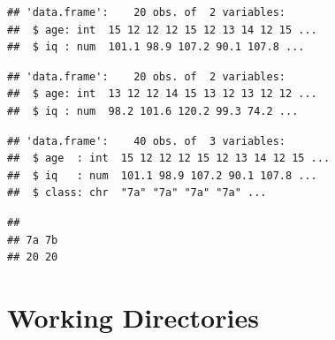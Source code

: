 \documentclass[
]{book}
\newenvironment{Shaded}{\begin{snugshade}}{\end{snugshade}}
\newcommand{\CommentTok}[1]{\textcolor[rgb]{0.56,0.35,0.01}{\textit{#1}}}
\newcommand{\FunctionTok}[1]{\textcolor[rgb]{0.13,0.29,0.53}{\textbf{#1}}}
\newcommand{\NormalTok}[1]{#1}
\newcommand{\OtherTok}[1]{\textcolor[rgb]{0.56,0.35,0.01}{#1}}
\newcommand{\SpecialCharTok}[1]{\textcolor[rgb]{0.81,0.36,0.00}{\textbf{#1}}}
\newcommand{\StringTok}[1]{\textcolor[rgb]{0.31,0.60,0.02}{#1}}
\begin{document}
\begin{verbatim}
## 'data.frame':    20 obs. of  2 variables:
##  $ age: int  15 12 12 12 15 12 13 14 12 15 ...
##  $ iq : num  101.1 98.9 107.2 90.1 107.8 ...
\end{verbatim}

\begin{verbatim}
## 'data.frame':    20 obs. of  2 variables:
##  $ age: int  13 12 12 14 15 13 12 13 12 12 ...
##  $ iq : num  98.2 101.6 120.2 99.3 74.2 ...
\end{verbatim}

\begin{Shaded}
\end{Shaded}

\begin{verbatim}
## 'data.frame':    40 obs. of  3 variables:
##  $ age  : int  15 12 12 12 15 12 13 14 12 15 ...
##  $ iq   : num  101.1 98.9 107.2 90.1 107.8 ...
##  $ class: chr  "7a" "7a" "7a" "7a" ...
\end{verbatim}

\begin{Shaded}
\end{Shaded}

\begin{verbatim}
## 
## 7a 7b 
## 20 20
\end{verbatim}

\section{Working Directories}\label{working-directories}
\end{document}
